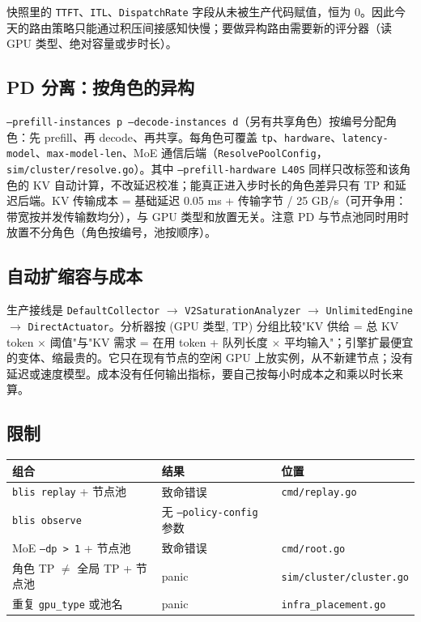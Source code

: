 \documentclass[11pt,a4paper,fontset=windows]{ctexart}
\begin{document}
快照里的 \texttt{TTFT}、\texttt{ITL}、\texttt{DispatchRate} 字段从未被生产代码赋值，恒为 0。因此今天的路由策略只能通过积压间接感知快慢；要做异构路由需要新的评分器（读 GPU 类型、绝对容量或步时长）。

\subsection{PD 分离：按角色的异构}

\texttt{--prefill-instances p --decode-instances d}（另有共享角色）按编号分配角色：先 prefill、再 decode、再共享。每角色可覆盖 \texttt{tp}、\texttt{hardware}、\texttt{latency-model}、\texttt{max-model-len}、MoE 通信后端（\texttt{ResolvePoolConfig}，\texttt{sim/cluster/resolve.go}）。其中 \texttt{--prefill-hardware L40S} 同样只改标签和该角色的 KV 自动计算，不改延迟校准；能真正进入步时长的角色差异只有 TP 和延迟后端。KV 传输成本 = 基础延迟 0.05 ms + 传输字节 / 25 GB/s（可开争用：带宽按并发传输数均分），与 GPU 类型和放置无关。注意 PD 与节点池同时用时放置不分角色（角色按编号，池按顺序）。

\subsection{自动扩缩容与成本}

生产接线是 \texttt{DefaultCollector} $\to$ \texttt{V2SaturationAnalyzer} $\to$ \texttt{UnlimitedEngine} $\to$ \texttt{DirectActuator}。分析器按 (GPU 类型, TP) 分组比较"KV 供给 = 总 KV token $\times$ 阈值"与"KV 需求 = 在用 token + 队列长度 $\times$ 平均输入"；引擎扩最便宜的变体、缩最贵的。它只在现有节点的空闲 GPU 上放实例，从不新建节点；没有延迟或速度模型。成本没有任何输出指标，要自己按每小时成本之和乘以时长来算。

\subsection{限制}

\begin{center}\begin{tabular}{lll}\toprule
组合 & 结果 & 位置 \\ \midrule
\texttt{blis replay} + 节点池 & 致命错误 & \texttt{cmd/replay.go} \\
\texttt{blis observe} & 无 \texttt{--policy-config} 参数 & \\
MoE \texttt{--dp > 1} + 节点池 & 致命错误 & \texttt{cmd/root.go} \\
角色 TP $\ne$ 全局 TP + 节点池 & panic & \texttt{sim/cluster/cluster.go} \\
重复 \texttt{gpu\_type} 或池名 & panic & \texttt{infra\_placement.go} \\ \bottomrule
\end{tabular}\end{center}
\end{document}
